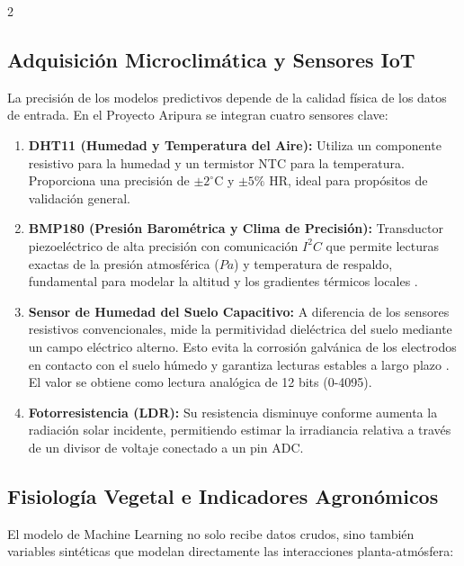 \documentclass[a4paper, 11pt]{article}
\begin{document}
\begin{multicols}{2}
\subsection{Adquisición Microclimática y Sensores IoT}
La precisión de los modelos predictivos depende de la calidad física de los datos de entrada. En el Proyecto Aripura se integran cuatro sensores clave:
\begin{enumerate}
    \item \textbf{DHT11 (Humedad y Temperatura del Aire):} Utiliza un componente resistivo para la humedad y un termistor NTC para la temperatura. Proporciona una precisión de $\pm 2^\circ\text{C}$ y $\pm 5\%$ HR, ideal para propósitos de validación general.
    \item \textbf{BMP180 (Presión Barométrica y Clima de Precisión):} Transductor piezoeléctrico de alta precisión con comunicación $I^2C$ que permite lecturas exactas de la presión atmosférica ($Pa$) y temperatura de respaldo, fundamental para modelar la altitud y los gradientes térmicos locales \cite{ref2}.
    \item \textbf{Sensor de Humedad del Suelo Capacitivo:} A diferencia de los sensores resistivos convencionales, mide la permitividad dieléctrica del suelo mediante un campo eléctrico alterno. Esto evita la corrosión galvánica de los electrodos en contacto con el suelo húmedo y garantiza lecturas estables a largo plazo \cite{ref3}. El valor se obtiene como lectura analógica de 12 bits (\num{0}-\num{4095}).
    \item \textbf{Fotorresistencia (LDR):} Su resistencia disminuye conforme aumenta la radiación solar incidente, permitiendo estimar la irradiancia relativa a través de un divisor de voltaje conectado a un pin ADC.
\end{enumerate}

\subsection{Fisiología Vegetal e Indicadores Agronómicos}
El modelo de Machine Learning no solo recibe datos crudos, sino también variables sintéticas que modelan directamente las interacciones planta-atmósfera:


\end{multicols}
\end{document}
